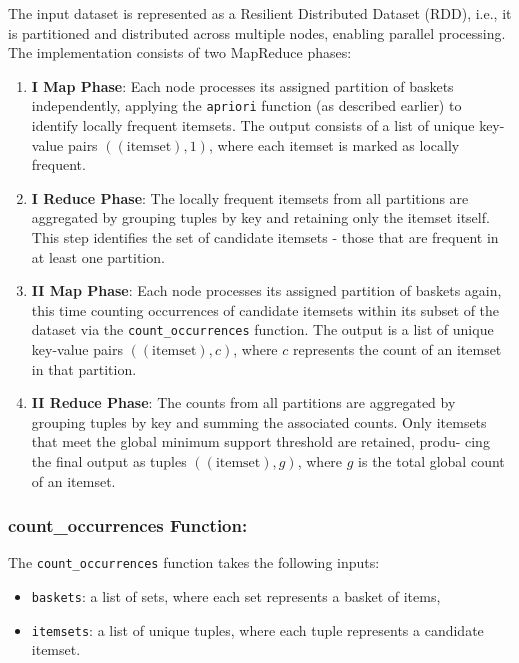 \documentclass{Class/julia}
\begin{document}
The input dataset is represented as a Resilient Distributed Dataset (RDD), i.e., it is partitioned and distributed across multiple nodes, enabling parallel processing. The implementation consists of two MapReduce phases:

\begin{enumerate}
    \item \textbf{I Map Phase}: Each node processes its assigned partition of baskets independently, applying the \texttt{apriori} function (as described earlier) to identify locally frequent itemsets. The output consists of a list of unique key-value pairs \(((\text{itemset}), 1)\), where each itemset is marked as locally frequent.

    \item \textbf{I Reduce Phase}: The locally frequent itemsets from all partitions are aggregated by grouping tuples by key and retaining only the itemset itself. This step identifies the set of candidate itemsets - those that are frequent in at least one partition.

    \item \textbf{II Map Phase}: Each node processes its assigned partition of baskets again, this time counting occurrences of candidate itemsets within its subset of the dataset via the \texttt{count\_occurrences} function. The output is a list of unique key-value pairs \(((\text{itemset}), c)\), where \( c \) represents the count of an itemset in that partition.

    \item \textbf{II Reduce Phase}: The counts from all partitions are aggregated by grouping tuples by key and summing the associated counts. Only itemsets that meet the global minimum support threshold are retained, produ- cing the final output as tuples \(((\text{itemset}), g)\), where \( g \) is the total global count of an itemset.
\end{enumerate}

\subsubsection*{count\_occurrences Function:}

The \texttt{count\_occurrences} function takes the following inputs:

\begin{itemize}
\item \texttt{baskets}: a list of sets, where each set represents a basket of items,
\item \texttt{itemsets}: a list of unique tuples, where each tuple represents a candidate itemset.
\end{itemize}
\end{document}
